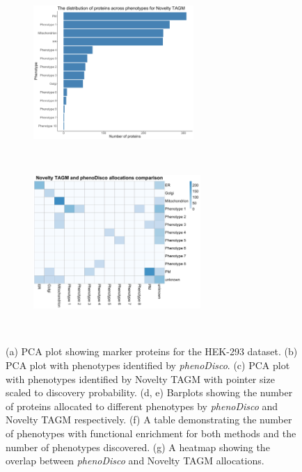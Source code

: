 \documentclass[12pt,english]{article}
\begin{document}
\begin{figure}
\begin{subfigure}[t]{0.5\textwidth}
		\caption{}
	\end{subfigure}
	\begin{subfigure}[t]{0.5\textwidth}
		\centering
		\includegraphics[height=2in]{noveltytagmdist}
		\caption{}
	\end{subfigure}	
~
\begin{subfigure}{0.5\textwidth}
			\caption{}
\end{subfigure}
	\begin{subfigure}[t]{0.5\textwidth}
	\centering
	\includegraphics[height=2in, valign=c]{hekcompare}
	\caption{}
\end{subfigure}
~
	\caption{(a) PCA plot showing marker proteins for the HEK-293 dataset. (b) PCA plot with phenotypes identified by \textit{phenoDisco}. (c) PCA plot with phenotypes identified by Novelty TAGM with pointer size scaled to discovery probability. (d, e) Barplots showing the number of proteins allocated to different phenotypes by \textit{phenoDisco} and Novelty TAGM respectively. (f) A table demonstrating the number of phenotypes with functional enrichment for both methods and the number of phenotypes discovered. (g) A heatmap showing the overlap between \textit{phenoDisco} and Novelty TAGM allocations.
	}
	\label{figure:phenodisco}
\end{figure}
\clearpage
\end{document}
